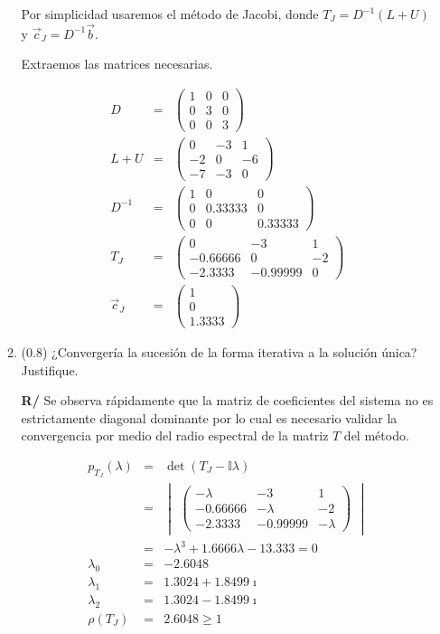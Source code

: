 \documentclass[12pt]{article}
\newcommand{\I}{\ensuremath{\mathbb{I}}}
\begin{document}
\begin{enumerate}[leftmargin=*,widest=9]
\begin{enumerate}[label=\alph*]
Por simplicidad usaremos el método de Jacobi, donde \(T_J = D^{-1}(L+U)\) y \(\vec{c}_J = D^{-1}\vec{b}\).

Extraemos las matrices necesarias.

\begin{eqnarray*}
D &=& \begin{pmatrix}
1 & 0 & 0\\
0 & 3 & 0\\
0 & 0 & 3
\end{pmatrix} \\
L+U &=& \begin{pmatrix}
0 & -3 & 1\\
-2 & 0 & -6\\
-7 & -3 & 0
\end{pmatrix} \\
D^{-1} &=& \begin{pmatrix}
1 & 0 & 0\\
0 & 0.33333 & 0\\
0 & 0 & 0.33333
\end{pmatrix}\\
T_J &=& \begin{pmatrix}
0 & -3 & 1\\
-0.66666 & 0 & -2\\
-2.3333 & -0.99999 & 0
\end{pmatrix}\\
\vec{c}_J &=& \begin{pmatrix}
1\\0\\1.3333
\end{pmatrix}
\end{eqnarray*}

    \item (\(0.8\)) ¿Convergería la sucesión de la forma iterativa a la solución única? Justifique.
    
    \textbf{R/} Se observa rápidamente que la matriz de coeficientes del sistema no es estrictamente diagonal dominante por lo cual es necesario validar la convergencia por medio del radio espectral de la matriz \(T\) del método.
    
\begin{eqnarray*}
p_{T_J}(\lambda) &=& \det(T_J - \I\lambda) \\
&=& \begin{vmatrix}
\begin{pmatrix}
-\lambda & -3 & 1\\
-0.66666 & -\lambda & -2\\
-2.3333 & -0.99999 & -\lambda
\end{pmatrix}
\end{vmatrix}\\
&=& -\lambda^3 +1.6666\lambda - 13.333 = 0\\
\lambda_0 &=& -2.6048\\
\lambda_1 &=& 1.3024 + 1.8499\imath\\
\lambda_2 &=& 1.3024 - 1.8499\imath\\
\rho(T_J) &=& 2.6048 \geq 1
\end{eqnarray*}


\end{enumerate}
\end{enumerate}
\end{document}
